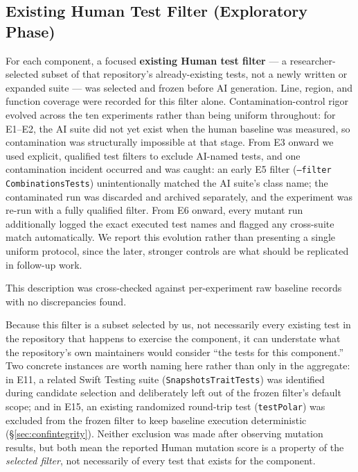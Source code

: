 \documentclass[10pt,conference]{IEEEtran}
\begin{document}
\subsection{Existing Human Test Filter (Exploratory Phase)}
\label{sec:humanbaseline}
For each component, a focused \textbf{existing Human test filter} — a researcher-selected subset of that repository's already-existing tests, not a newly written or expanded suite — was selected and frozen before AI generation. Line, region, and function coverage were recorded for this filter alone. Contamination-control rigor evolved across the ten experiments rather than being uniform throughout: for E1--E2, the AI suite did not yet exist when the human baseline was measured, so contamination was structurally impossible at that stage. From E3 onward we used explicit, qualified test filters to exclude AI-named tests, and one contamination incident occurred and was caught: an early E5 filter (\texttt{--filter CombinationsTests}) unintentionally matched the AI suite's class name; the contaminated run was discarded and archived separately, and the experiment was re-run with a fully qualified filter. From E6 onward, every mutant run additionally logged the exact executed test names and flagged any cross-suite match automatically. We report this evolution rather than presenting a single uniform protocol, since the later, stronger controls are what should be replicated in follow-up work.

This description was cross-checked against per-experiment raw baseline records with no discrepancies found.

Because this filter is a subset selected by us, not necessarily every existing test in the repository that happens to exercise the component, it can understate what the repository's own maintainers would consider ``the tests for this component.'' Two concrete instances are worth naming here rather than only in the aggregate: in E11, a related Swift Testing suite (\texttt{SnapshotsTraitTests}) was identified during candidate selection and deliberately left out of the frozen filter's default scope; and in E15, an existing randomized round-trip test (\texttt{testPolar}) was excluded from the frozen filter to keep baseline execution deterministic (\S\ref{sec:confintegrity}). Neither exclusion was made after observing mutation results, but both mean the reported Human mutation score is a property of the \emph{selected filter}, not necessarily of every test that exists for the component.
\end{document}
